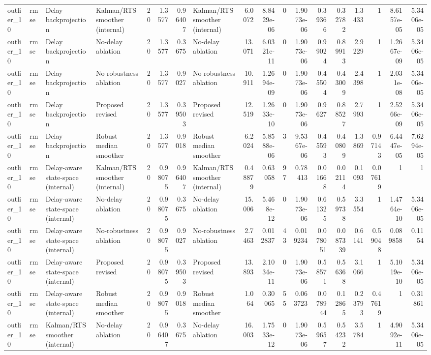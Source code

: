 \begin{table}[!htbp]
{\begin{tabular}{llllrrrlrrrrrrrrrr}
outlier_10 & rmse & Delay backprojection & Kalman/RTS smoother (internal) & 20 & 1.3577 & 0.96407 & Kalman/RTS smoother (internal) & 6.0072 & 8.8429e-06 & 0 & 1.9073e-06 & 0.39366 & 0.32782 & 1.3433 & 1 & 8.6157e-05 & 5.3406e-05 \\
outlier_10 & rmse & Delay backprojection & No-delay ablation & 20 & 1.3577 & 0.3675 & No-delay ablation & 13.071 & 6.0321e-11 & 0 & 1.9073e-06 & 0.99024 & 0.89913 & 2.9229 & 1 & 1.2667e-09 & 5.3406e-05 \\
outlier_10 & rmse & Delay backprojection & No-robustness ablation & 20 & 1.3577 & 0.9027 & No-robustness ablation & 10.911 & 1.2694e-09 & 0 & 1.9073e-06 & 0.45504 & 0.43009 & 2.4398 & 1 & 2.031e-08 & 5.3406e-05 \\
outlier_10 & rmse & Delay backprojection & Proposed revised & 20 & 1.3577 & 0.39503 & Proposed revised & 12.519 & 1.2633e-10 & 0 & 1.9073e-06 & 0.9627 & 0.88527 & 2.7993 & 1 & 2.5266e-09 & 5.3406e-05 \\
outlier_10 & rmse & Delay backprojection & Robust median smoother & 20 & 1.3577 & 0.9018 & Robust median smoother & 6.2024 & 5.8588e-06 & 3 & 9.5367e-06 & 0.45593 & 0.40809 & 1.3869 & 0.97143 & 6.4447e-05 & 7.6294e-05 \\
outlier_10 & rmse & Delay-aware state-space (internal) & Kalman/RTS smoother (internal) & 20 & 0.98075 & 0.96407 & Kalman/RTS smoother (internal) & 0.48879 & 0.63058 & 97 & 0.78413 & 0.01668 & 0.02114 & 0.1093 & 0.07619 & 1 & 1 \\
outlier_10 & rmse & Delay-aware state-space (internal) & No-delay ablation & 20 & 0.98075 & 0.3675 & No-delay ablation & 15.006 & 5.468e-12 & 0 & 1.9073e-06 & 0.61325 & 0.59738 & 3.3554 & 1 & 1.4764e-10 & 5.3406e-05 \\
outlier_10 & rmse & Delay-aware state-space (internal) & No-robustness ablation & 20 & 0.98075 & 0.9027 & No-robustness ablation & 2.7463 & 0.012837 & 43 & 0.019234 & 0.078051 & 0.087339 & 0.6141 & 0.59048 & 0.089858 & 0.1154 \\
outlier_10 & rmse & Delay-aware state-space (internal) & Proposed revised & 20 & 0.98075 & 0.39503 & Proposed revised & 13.893 & 2.1034e-11 & 0 & 1.9073e-06 & 0.58571 & 0.56368 & 3.1066 & 1 & 5.1019e-10 & 5.3406e-05 \\
outlier_10 & rmse & Delay-aware state-space (internal) & Robust median smoother & 20 & 0.98075 & 0.9018 & Robust median smoother & 1.064 & 0.30065 & 55 & 0.063723 & 0.078944 & 0.12865 & 0.23793 & 0.47619 & 1 & 0.31861 \\
outlier_10 & rmse & Kalman/RTS smoother (internal) & No-delay ablation & 20 & 0.96407 & 0.3675 & No-delay ablation & 16.003 & 1.7533e-12 & 0 & 1.9073e-06 & 0.59657 & 0.54232 & 3.5784 & 1 & 4.9092e-11 & 5.3406e-05 \\

\end{tabular}}
\end{table}
